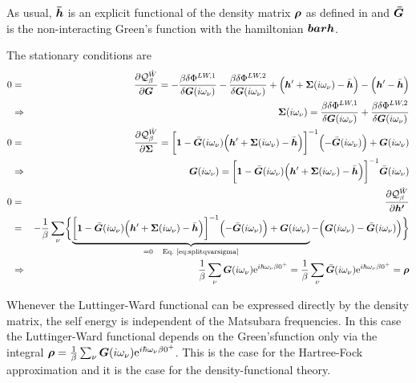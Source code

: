 \documentclass[11pt,a4paper]{report}
\begin{document}
As usual, $\bm{\bar{h}}$ is an explicit functional of the density
matrix $\bm{\rho}$ as defined in  and $\bm{\bar{G}}$
is the non-interacting Green's function with the hamiltonian
$\bm{bar{h}}$.


The stationary conditions are
\begin{eqnarray}
0&=&
\frac{\partial\mathcal{Q}^{\hat{W}}_\beta}{\partial\mat{G}}
=-\frac{\beta\delta\Phi^{LW,1}}{\delta\mat{G}(i\omega_\nu)}
-\frac{\beta\delta\Phi^{LW,2}}{\delta\mat{G}(i\omega_\nu)}
+\Bigl(\mat{h}'+\mat{\Sigma}(i\omega_\nu)-\bar{\mat{h}}\Bigr)
-\Bigl(\mat{h}'-\bar{\mat{h}}\Bigr)
\nonumber\\
&\Rightarrow&\qquad
\mat{\Sigma}(i\omega_\nu)
=\frac{\beta\delta\Phi^{LW,1}}{\delta\mat{G}(i\omega_\nu)}
+\frac{\beta\delta\Phi^{LW,2}}{\delta\mat{G}(i\omega_\nu)}
\nonumber\\
0&=&
\frac{\partial\mathcal{Q}^{\hat{W}}_\beta}{\partial\mat{\Sigma}}
=
\biggl[\mat{1}-\bar{\mat{G}}(i\omega_\nu)
\Bigl(\mat{h}'+\mat{\Sigma}(i\omega_\nu)-\bar{\mat{h}}\Bigr)\biggr]^{-1}
\Bigl(-\bar{\mat{G}}(i\omega_\nu)\Bigr)+\mat{G}(i\omega_\nu)
\label{eq:splitqvarsigma}
\\
&\Rightarrow&\qquad
\mat{G}(i\omega_\nu)=\biggl[\mat{1}-\bar{\mat{G}}(i\omega_\nu)
\Bigl(\mat{h}'
+\mat{\Sigma}(i\omega_\nu)-\bar{\mat{h}}\Bigr)\biggr]^{-1}
\bar{\mat{G}}(i\omega_\nu)
\nonumber\\
0&=&
\frac{\partial\mathcal{Q}^{\hat{W}}_\beta}{\partial\mat{h'}}
\nonumber\\
&=&-\frac{1}{\beta}\sum_\nu\biggl\lbrace
\underbrace{\biggl[\mat{1}-\bar{\mat{G}}(i\omega_\nu)
\Bigl(\mat{h}'+\mat{\Sigma}(i\omega_\nu)-\bar{\mat{h}}\Bigr)\biggr]^{-1}
\Bigl(-\bar{\mat{G}}(i\omega_\nu)\Bigr)+\mat{G}(i\omega_\nu)}
_{=0\quad\text{\eq{eq:splitqvarsigma}}}
-\Bigl(\mat{G}(i\omega_\nu)
-\bar{\mat{G}}(i\omega_\nu)\Bigr)\biggr\rbrace
\nonumber\\
&\Rightarrow&\qquad
\frac{1}{\beta}\sum_\nu
\mat{G}(i\omega_\nu)\e{i\hbar\omega_\nu\beta0^+}
=\frac{1}{\beta}\sum_\nu
\bar{\mat{G}}(i\omega_\nu)\e{i\hbar\omega_\nu\beta0^+}
=\mat{\rho}
\end{eqnarray}

Whenever the Luttinger-Ward functional can be expressed directly by
the density matrix, the self energy is independent of the Matsubara
frequencies. In this case the Luttinger-Ward functional depends on the
Green'sfunction only via the integral $\bm{\rho}=
\frac{1}{\beta}\sum_\nu
\bm{G}(i\omega_\nu)\mathrm{e}^{i\hbar\omega_\nu\beta0^+}$. This is the case
for the Hartree-Fock approximation and it is the case for the
density-functional theory.
\end{document}
